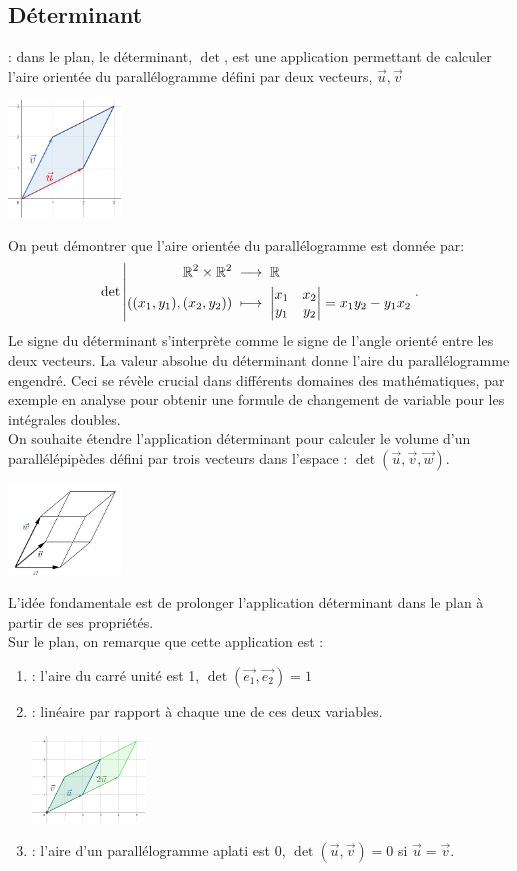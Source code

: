 \documentclass{book}
\begin{document}
\subsection{Déterminant}
 : dans le plan, le déterminant, $\det$, est une application permettant de calculer l'aire orientée du parallélogramme défini par deux vecteurs, $\vec{u},\vec{v}$  
\begin{center}
\includegraphics[width=3cm]{determinant.png}
\end{center}
On peut démontrer que l'aire orientée du parallélogramme est donnée par:  
$$
{\mathop{\mathrm{det}}\nolimits}\left|\begin{aligned}{\mathbb{R}^2\times\mathbb{R}^2}&\;\longrightarrow\;{\mathbb{R}}\\{((x_1,y_1),(x_2,y_2))}&\;\longmapsto\;{\begin{vmatrix}
x_1 & x_2 \\
y_1 & y_2
\end{vmatrix}=x_1y_2-y_1x_2}\end{aligned}\right..
$$
Le signe du déterminant s'interprète comme le signe de l'angle orienté entre les deux vecteurs. La valeur absolue du déterminant donne l'aire du parallélogramme engendré. Ceci se révèle crucial dans
différents domaines des mathématiques, par exemple en analyse pour obtenir une formule de changement de variable pour les intégrales doubles.\\
On souhaite étendre l'application déterminant pour calculer le volume d'un parallélépipèdes défini par trois vecteurs dans l'espace : $\det(\vec{u},\vec{v},\vec{w}).$
\begin{center}
\includegraphics[width=3cm]{determinant3.png}
\end{center}
L'idée fondamentale est de prolonger l'application  déterminant dans le plan à partir de ses propriétés.\\ 
Sur le plan, on remarque que cette application est :
\begin{enumerate}
\item {} : l'aire du carré unité est 1, $\det(\vec{e_1},\vec{e_2})=1$
\item {} : linéaire par rapport à chaque une de ces deux variables.
\begin{center}
\includegraphics[width=3cm]{determinant2.png}
\end{center}
\item {} : l'aire d'un parallélogramme aplati est 0, $\det(\vec{u},\vec{v})=0$ si $\vec{u}=\vec{v}.$
\end{enumerate}
\end{document}
